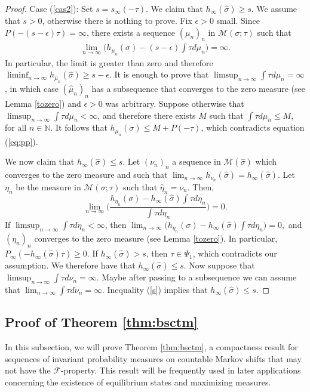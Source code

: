 \documentclass[letterpaper,11pt]{amsart}
\theoremstyle{plain}
\theoremstyle{plain}
\theoremstyle{definition}
\theoremstyle{remark}
\def\N{{\mathbb N}}
\def\M{{\mathcal M}}
\def\F{{\mathcal F}}
\begin{document}
\begin{proof}
Case (\ref{cas2}): Set $s=s_\infty(-\tau)$. We claim that $h_\infty(\widehat{\sigma})\ge s$. We assume that $s>0$, otherwise there is nothing to prove. Fix $\epsilon>0$ small. Since $P(-(s-\epsilon)\tau)=\infty$, there exists a sequence  $(\mu_n)_n$ in  $\M(\sigma;\tau)$ such that 
\begin{align}\label{eq:pp}\lim_{n\to\infty}\bigg(h_{\mu_n}(\sigma)-(s-\epsilon)\int \tau d\mu_n\bigg)=\infty.\end{align} In particular, the limit is greater than zero and therefore $\liminf_{n\to\infty}h_{\widehat{\mu}_n}(\widehat{\sigma})\ge s-\epsilon$. It is enough to prove that $\limsup_{n\to\infty}\int \tau d\mu_n=\infty$, in which case $(\widehat{\mu}_n)_n$ has a subsequence that converges to the zero measure (see Lemma \ref{tozero}) and $\epsilon>0$ was arbitrary. Suppose otherwise that $\limsup_{n\to\infty}\int \tau d\mu_n<\infty$, and therefore there exists $M$ such that $\int \tau d\mu_n\le M$, for all $n\in \N$. It follows that $h_{\mu_n}(\sigma)\le M+P(-\tau)$, which contradicts equation (\ref{eq:pp}).


We now claim that $h_\infty(\widehat{\sigma})\le s$. Let $(\nu_n)_n$ a sequence in $\M(\widehat{\sigma})$ which converges to the zero measure and such that $\lim_{n\to\infty}h_{\nu_n}(\widehat{\sigma})=h_\infty(\widehat{\sigma})$. Let $\eta_n$ be the measure in   $\M(\sigma;\tau)$ such that $\widehat{\eta}_n =\nu_n$. Then, 
$$\lim_{n\to\infty}\bigg(\frac{h_{\eta_n}(\sigma)-h_\infty(\widehat{\sigma})\int \tau d\eta_n}{\int \tau d\eta_n}\bigg)=0.$$
If $\limsup_{n\to\infty}\int \tau d\eta_n<\infty$, then $\lim_{n\to\infty}\big(h_{\eta_n}(\sigma)-h_\infty(\widehat{\sigma})\int \tau d\eta_n\big)=0,$ and $(\eta_n)_n$ converges to the zero measure (see Lemma \ref{tozero}).  In particular, $P_\infty(-h_\infty(\widehat{\sigma})\tau)\ge 0$. If $h_\infty(\widehat{\sigma})> s$, then $\tau\in \Psi_1$, which contradicts our assumption. We therefore have that $h_\infty(\widehat{\sigma})\le s$. Now suppose that $\limsup_{n\to\infty}\int \tau d\nu_n=\infty.$ Maybe after passing to a subsequence we can assume that $\lim_{n\to\infty}\int \tau d\nu_n=\infty$. Inequality (\ref{s}) implies that $h_\infty(\widehat{\sigma})\le s$. 
\end{proof}


\subsection{Proof of Theorem \ref{thm:bsctm}} In this subsection, we will prove Theorem \ref{thm:bsctm}, a compactness result for sequences of invariant probability measures on countable Markov shifts that may not have the $\F$-property. This result will be frequently used in later applications concerning the existence of equilibrium states and maximizing measures.
\end{document}
